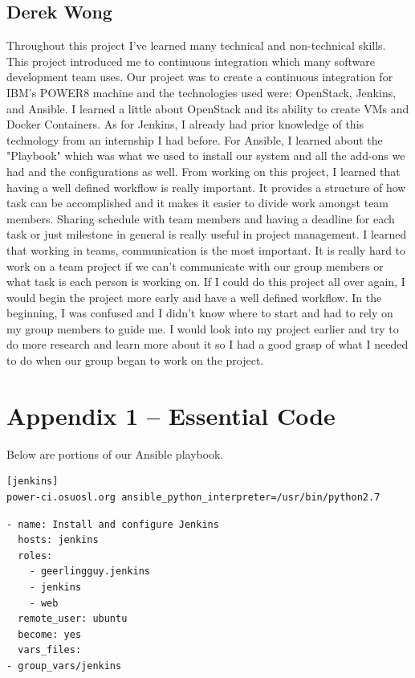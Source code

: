 \documentclass[10pt,letterpaper,onecolumn,draftclsnofoot]{IEEEtran}
\begin{document}
\subsection{Derek Wong}
Throughout this project I've learned many technical and non-technical skills.
This project introduced me to continuous integration which many software development team uses.
Our project was to create a continuous integration for IBM's POWER8 machine and the technologies used were:
OpenStack, Jenkins, and Ansible. I learned a little about OpenStack and its ability to create VMs and Docker Containers.
As for Jenkins, I already had prior knowledge of this technology from an internship I had before.
For Ansible, I learned about the "Playbook" which was what we used to install our system and
all the add-ons we had and the configurations as well.
From working on this project, I learned that having a well defined workflow is really important.
It provides a structure of how task can be accomplished and it makes it easier to divide work amongst team members.
Sharing schedule with team members and having a deadline for each task or just milestone in 
general is really useful in project management.
I learned that working in teams, communication is the most important.
It is really hard to work on a team project if we can't communicate with our group members or what task is each person is working on.
If I could do this project all over again, I would begin the project more early and have a well defined workflow.
In the beginning, I was confused and I didn't know where to start and had to rely on my group members to guide me.
I would look into my project earlier and try to do more research and learn more about it so I 
had a good grasp of what I needed to do when our group began to work on the project.

\clearpage


\clearpage

\section{Appendix 1 -- Essential Code}
Below are portions of our Ansible playbook.
\begin{lstlisting}[caption=Ansible Host file]
[jenkins]
power-ci.osuosl.org ansible_python_interpreter=/usr/bin/python2.7
\end{lstlisting}

\begin{lstlisting}[caption=Ansible Jenkins Playbook]
- name: Install and configure Jenkins
  hosts: jenkins
  roles:
    - geerlingguy.jenkins
    - jenkins
    - web
  remote_user: ubuntu
  become: yes
  vars_files:
- group_vars/jenkins
\end{lstlisting}
\end{document}
